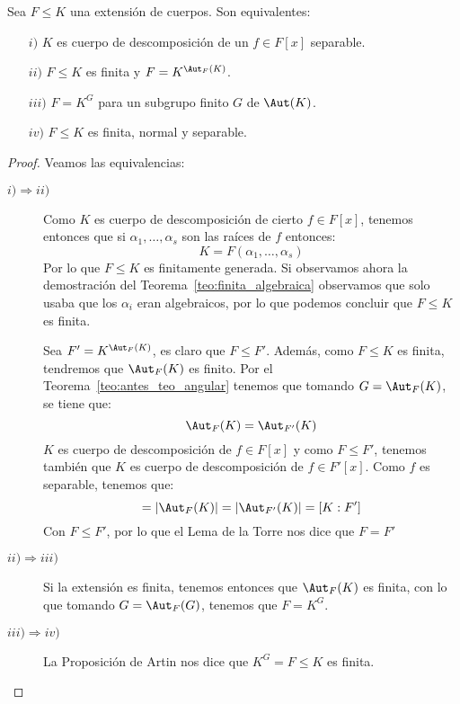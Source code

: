 \begin{teo}\label{teo:piedra_angular}
    Sea $F\leq K$ una extensión de cuerpos. Son equivalentes: 
    \begin{enumerate}
        \item[$i)$] $K$ es cuerpo de descomposición de un $f\in F[x]$ separable.
        \item[$ii)$] $F\leq K$ es finita y $F = K^{\Aut_F(K)}$.
        \item[$iii)$] $F = K^G$ para un subgrupo finito $G$ de $\Aut(K)$.
        \item[$iv)$] $F\leq K$ es finita, normal y separable.
    \end{enumerate}
    \begin{proof}
        Veamos las equivalencias:
        \begin{description}
            \item [$i)\Longrightarrow  ii)$] Como $K$ es cuerpo de descomposición de cierto $f\in F[x]$, tenemos entonces que si $\alpha_1, \ldots, \alpha_s$ son las raíces de $f$ entonces:
                \begin{equation*}
                    K = F(\alpha_1, \ldots, \alpha_s)
                \end{equation*}
                Por lo que $F\leq K$ es finitamente generada. Si observamos ahora la demostración del Teorema~\ref{teo:finita_algebraica} observamos que solo usaba que los $\alpha_i$ eran algebraicos, por lo que podemos concluir que $F\leq K$ es finita.

                Sea $F' = K^{\Aut_F(K)}$, es claro que $F\leq F'$. Además, como $F\leq K$ es finita, tendremos que $\Aut_F(K)$ es finito. Por el Teorema~\ref{teo:antes_teo_angular} tenemos que tomando $G = \Aut_F(K)$, se tiene que:
                \begin{equation*}
                    \Aut_F(K) = \Aut_{F'}(K)
                \end{equation*}
                $K$ es cuerpo de descomposición de $f\in F[x]$ y como $F\leq F'$, tenemos también que $K$ es cuerpo de descomposición de $f\in F'[x]$. Como $f$ es separable, tenemos que:
                \begin{equation*}
                    [K:F] = |\Aut_F(K)| = |\Aut_{F'}(K)| = [K:F']
                \end{equation*}
                Con $F\leq F'$, por lo que el Lema de la Torre nos dice que $F = F'$
            \item [$ii)\Longrightarrow iii)$] Si la extensión es finita, tenemos entonces que $\Aut_F(K)$ es finita, con lo que tomando $G= \Aut_F(G)$, tenemos que $F=K^G$.
            \item [$iii)\Longrightarrow iv)$] La Proposición de Artin nos dice que $K^G = F\leq K$ es finita. 


\end{description}
\end{proof}
\end{teo}
